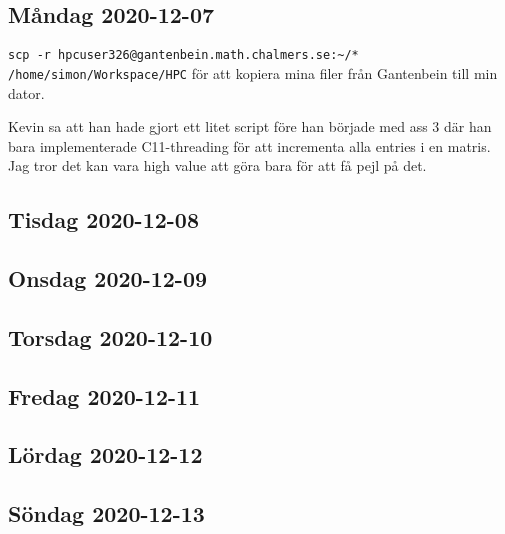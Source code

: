 
\subsection{Måndag 2020-12-07}

\verb|scp -r hpcuser326@gantenbein.math.chalmers.se:~/* /home/simon/Workspace/HPC| för att kopiera mina filer från Gantenbein till min dator.

Kevin sa att han hade gjort ett litet script före han började med ass 3 där han bara implementerade C11-threading för att incrementa alla entries i en matris. Jag tror det kan vara high value att göra bara för att få pejl på det.


\subsection{Tisdag 2020-12-08}
\subsection{Onsdag 2020-12-09}
\subsection{Torsdag 2020-12-10}
\subsection{Fredag 2020-12-11}
\subsection{Lördag 2020-12-12}
\subsection{Söndag 2020-12-13}

